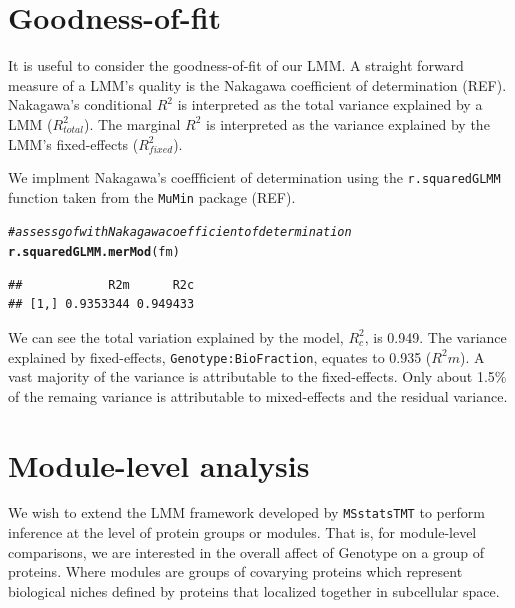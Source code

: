 \documentclass[11pt]{elife}\usepackage[]{graphicx}\usepackage[]{color}
\makeatletter
\newcommand{\hlcom}[1]{\textcolor[rgb]{0.678,0.584,0.686}{\textit{#1}}}%
\newcommand{\hlstd}[1]{\textcolor[rgb]{0.345,0.345,0.345}{#1}}%
\newcommand{\hlkwd}[1]{\textcolor[rgb]{0.737,0.353,0.396}{\textbf{#1}}}%
\newenvironment{kframe}{%
 \def\at@end@of@kframe{}%
 \ifinner\ifhmode%
  \def\at@end@of@kframe{\end{minipage}}%
  \begin{minipage}{\columnwidth}%
 \fi\fi%
 \def\FrameCommand##1{\hskip\@totalleftmargin \hskip-\fboxsep
 \colorbox{shadecolor}{##1}\hskip-\fboxsep
     \hskip-\linewidth \hskip-\@totalleftmargin \hskip\columnwidth}%
 \MakeFramed {\advance\hsize-\width
   \@totalleftmargin\z@ \linewidth\hsize
   \@setminipage}}%
 {\par\unskip\endMakeFramed%
 \at@end@of@kframe}
\newenvironment{knitrout}{}{} %
\makeatother
\begin{document}
\section{Goodness-of-fit}

It is useful to consider the goodness-of-fit of our LMM. A straight forward
measure of a LMM's quality is the Nakagawa coefficient of 
determination (REF). Nakagawa's conditional $R^2$ is interpreted as 
the total variance explained by a LMM ($R^2_{total}$).
The marginal $R^2$ is interpreted as the variance explained by the LMM's 
fixed-effects ($R^2_{fixed}$).

We implment Nakagawa's coeffficient of determination using the 
\texttt{r.squaredGLMM} function taken from the \texttt{MuMin} package (REF).\\


\begin{knitrout}
\color{fgcolor}\begin{kframe}
\begin{alltt}
\hlcom{# assess gof with Nakagawa coefficient of determination}
\hlkwd{r.squaredGLMM.merMod}\hlstd{(fm)}
\end{alltt}
\begin{verbatim}
##            R2m      R2c
## [1,] 0.9353344 0.949433
\end{verbatim}
\end{kframe}
\end{knitrout}

We can see the total variation explained by the model, $R^2_{c}$, is 0.949. 
The variance explained by fixed-effects, \texttt{Genotype:BioFraction},
equates to 0.935 ($R^2{m}$). A vast majority of the variance is attributable to 
the fixed-effects. Only about 1.5\% of the remaing variance is attributable to 
mixed-effects and the residual variance.\\

\section{Module-level analysis}

We wish to extend the LMM framework developed by \texttt{MSstatsTMT} to perform 
inference at the level of protein groups or modules.
That is, for module-level comparisons, we are interested in the overall affect 
of Genotype on a group of proteins. Where modules are groups of covarying 
proteins which represent biological niches defined by proteins that 
localized together in subcellular space.\\
\end{document}
